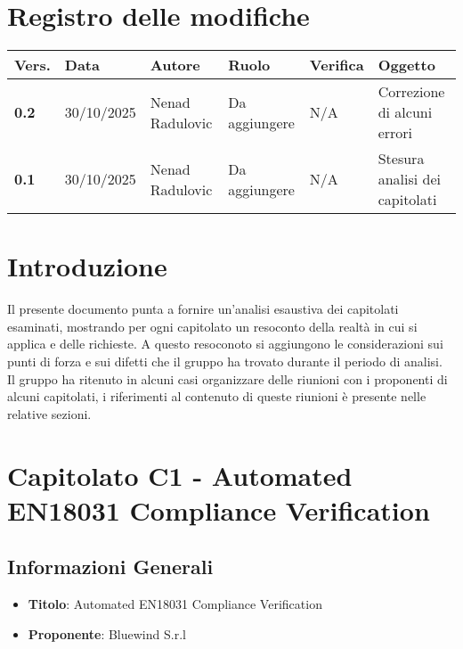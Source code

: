 \documentclass[a4paper,12pt]{article}
\begin{document}
    

    \section*{Registro delle modifiche} {
        \begin{tabularx}{\textwidth}{|l|l|X|l|X|X|}
        \hline
        \textbf{Vers.} & \textbf{Data} & \textbf{Autore} & \textbf{Ruolo} & \textbf{Verifica} & \textbf{Oggetto} \\
        \hline
        \textbf{0.2} & 30/10/2025 & Nenad Radulovic & Da aggiungere & N/A & Correzione di alcuni errori \\
        \textbf{0.1} & 30/10/2025 & Nenad Radulovic & Da aggiungere & N/A & Stesura analisi dei capitolati \\
        \hline
        \end{tabularx}
    }
    \newpage

    \tableofcontents
    \newpage

    \section{Introduzione}
    Il presente documento punta a fornire un'analisi esaustiva dei capitolati esaminati, mostrando per ogni capitolato un resoconto della realtà in cui si applica e delle richieste. A questo resoconoto si aggiungono le considerazioni sui punti di forza e sui difetti che il gruppo ha trovato durante il periodo di analisi. \\ Il gruppo ha ritenuto in alcuni casi organizzare delle riunioni con i proponenti di alcuni capitolati, i riferimenti al contenuto di queste riunioni è presente nelle relative sezioni.

    \section{Capitolato C1 - Automated EN18031 Compliance Verification}
    \subsection{Informazioni Generali}
        \begin{itemize}
            \item \textbf{Titolo}: Automated EN18031 Compliance Verification
            \item \textbf{Proponente}: Bluewind S.r.l
        \end{itemize}
\end{document}
